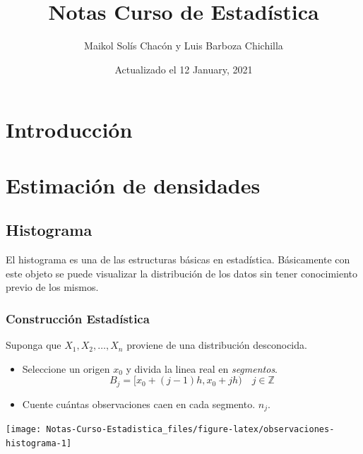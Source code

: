 \documentclass[
  12pt,
]{book}
\title{Notas Curso de Estadística}
\author{Maikol Solís Chacón y Luis Barboza Chichilla}
\date{Actualizado el 12 January, 2021}
\theoremstyle{definition}
\theoremstyle{definition}
\theoremstyle{definition}
\theoremstyle{remark}
\begin{document}
\maketitle

{
\hypersetup{linkcolor=}
\setcounter{tocdepth}{4}
\tableofcontents
}
\hypertarget{introducciuxf3n}{%
\chapter{Introducción}\label{introducciuxf3n}}

\hypertarget{estimaciuxf3n-de-densidades}{%
\chapter{Estimación de densidades}\label{estimaciuxf3n-de-densidades}}

\hypertarget{histograma}{%
\section{Histograma}\label{histograma}}

El histograma es una de las estructuras básicas en estadística. Básicamente con este objeto se puede visualizar la distribución de los datos sin tener conocimiento previo de los mismos.

\hypertarget{construcciuxf3n-estaduxedstica}{%
\subsection{Construcción Estadística}\label{construcciuxf3n-estaduxedstica}}

Suponga que \(X_1,X_2, \dots ,X_n\) proviene de una distribución desconocida.

\begin{itemize}
\item
  Seleccione un origen \(x_0\) y divida la linea real en \emph{segmentos}.
  \begin{equation*}
  B_j = [x_0 +(j - 1)h,x_0 + jh) \quad j\in \mathbb{Z}
  \end{equation*}
\item
  Cuente cuántas observaciones caen en cada segmento. \(n_j\).
\end{itemize}

\begin{center}\texttt{[image: Notas-Curso-Estadistica\_files/figure-latex/observaciones-histograma-1]} \end{center}
\end{document}
